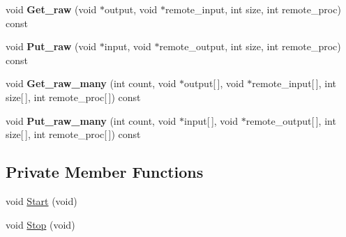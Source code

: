 \begin{DoxyCompactItemize}
\item 
\hypertarget{classMPIHandler_af8fdc175b3b92b0a79e05b24c540cc80}{}void {\bfseries Get\+\_\+raw} (void $\ast$output, void $\ast$remote\+\_\+input, int size, int remote\+\_\+proc) const \label{classMPIHandler_af8fdc175b3b92b0a79e05b24c540cc80}

\item 
\hypertarget{classMPIHandler_ae18f2798209d3a07ec1afb8515080575}{}void {\bfseries Put\+\_\+raw} (void $\ast$input, void $\ast$remote\+\_\+output, int size, int remote\+\_\+proc) const \label{classMPIHandler_ae18f2798209d3a07ec1afb8515080575}

\item 
\hypertarget{classMPIHandler_aef7f87f939348314d32f4fb4af15fad7}{}void {\bfseries Get\+\_\+raw\+\_\+many} (int count, void $\ast$output\mbox{[}$\,$\mbox{]}, void $\ast$remote\+\_\+input\mbox{[}$\,$\mbox{]}, int size\mbox{[}$\,$\mbox{]}, int remote\+\_\+proc\mbox{[}$\,$\mbox{]}) const \label{classMPIHandler_aef7f87f939348314d32f4fb4af15fad7}

\item 
\hypertarget{classMPIHandler_a8712664351efb3e1dfb9375b2bf23ad2}{}void {\bfseries Put\+\_\+raw\+\_\+many} (int count, void $\ast$input\mbox{[}$\,$\mbox{]}, void $\ast$remote\+\_\+output\mbox{[}$\,$\mbox{]}, int size\mbox{[}$\,$\mbox{]}, int remote\+\_\+proc\mbox{[}$\,$\mbox{]}) const \label{classMPIHandler_a8712664351efb3e1dfb9375b2bf23ad2}

\end{DoxyCompactItemize}
\subsection*{Private Member Functions}
\begin{DoxyCompactItemize}
\item 
void \hyperlink{classMPIHandler_a1072e62e8cbbd6fcdedc6aeecc6dea01}{Start} (void)
\item 
void \hyperlink{classMPIHandler_a9d25462b29a6e69df481be4e374db7a8}{Stop} (void)
\end{DoxyCompactItemize}
